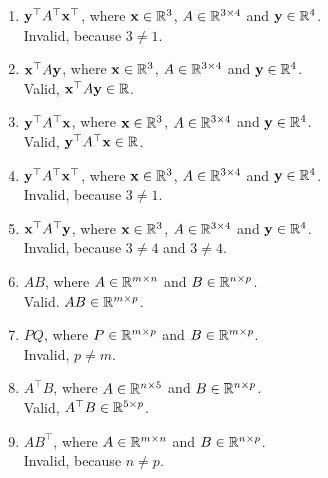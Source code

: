 \documentclass[twocolumn]{article}
\begin{document}
\begin{enumerate}
  \item $\mathbf{y}^\top A^\top \mathbf{x}^\top$, where $\mathbf{x} \in \mathbb{R}^{3}$, $A \in \mathbb{R}^{3 \times 4}$ and $\mathbf{y} \in \mathbb{R}^{4}$.
    \\
    Invalid, because $3 \ne 1$.
  \item $\mathbf{x}^\top A     \mathbf{y}    $, where $\mathbf{x} \in \mathbb{R}^{3}$, $A \in \mathbb{R}^{3 \times 4}$ and $\mathbf{y} \in \mathbb{R}^{4}$.
    \\
    Valid, $\mathbf{x}^\top A     \mathbf{y} \in \mathbb{R}$.
  \item $\mathbf{y}^\top A^\top \mathbf{x}$, where $\mathbf{x} \in \mathbb{R}^{3}$, $A \in \mathbb{R}^{3 \times 4}$ and $\mathbf{y} \in \mathbb{R}^{4}$.
    \\
    Valid, $\mathbf{y}^\top A^\top     \mathbf{x} \in \mathbb{R}$.
  \item $\mathbf{y}^\top A^\top \mathbf{x}^\top$, where $\mathbf{x} \in \mathbb{R}^{3}$, $A \in \mathbb{R}^{3 \times 4}$ and $\mathbf{y} \in \mathbb{R}^{4}$.
    \\
    Invalid, because $3 \ne 1$.
  \item $\mathbf{x}^\top A^\top \mathbf{y}$, where $\mathbf{x} \in \mathbb{R}^{3}$, $A \in \mathbb{R}^{3 \times 4}$ and $\mathbf{y} \in \mathbb{R}^{4}$.
    \\
    Invalid, because $3 \ne 4$ and $3 \ne 4$.

  \item $AB$, where $A \in \mathbb{R}^{m \times n}$ and $B \in \mathbb{R}^{n \times p}$.
    \\
    Valid. $AB \in \mathbb{R}^{m \times p}$.
  \item $PQ$, where $P \in \mathbb{R}^{m \times p}$ and $B \in \mathbb{R}^{m \times p}$.
    \\
    Invalid, $p \ne m$.
  \item $A^\top B$, where $A \in \mathbb{R}^{n \times 5}$ and $B \in \mathbb{R}^{n \times p}$.
    \\
    Valid, $A^\top B \in \mathbb{R}^{5 \times p}$.
  \item $AB^\top$, where $A \in \mathbb{R}^{m \times n}$ and $B \in \mathbb{R}^{n \times
      p}$.
    \\
    Invalid, because $n \ne p$.


\end{enumerate}
\end{document}
